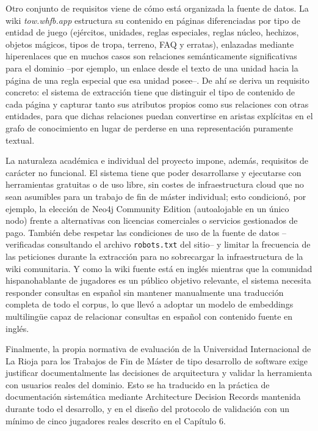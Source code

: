 \documentclass[11pt,a4paper,spanish]{book}
\numberwithin{equation}{chapter}
\numberwithin{figure}{chapter}
\numberwithin{table}{chapter}
\begin{document}
Otro conjunto de requisitos viene de cómo está organizada la fuente de datos. La wiki \emph{tow.whfb.app} estructura su contenido en páginas diferenciadas por tipo de entidad de juego (ejércitos, unidades, reglas especiales, reglas núcleo, hechizos, objetos mágicos, tipos de tropa, terreno, FAQ y erratas), enlazadas mediante hiperenlaces que en muchos casos son relaciones semánticamente significativas para el dominio --por ejemplo, un enlace desde el texto de una unidad hacia la página de una regla especial que esa unidad posee--. De ahí se deriva un requisito concreto: el sistema de extracción tiene que distinguir el tipo de contenido de cada página y capturar tanto sus atributos propios como sus relaciones con otras entidades, para que dichas relaciones puedan convertirse en aristas explícitas en el grafo de conocimiento en lugar de perderse en una representación puramente textual.

La naturaleza académica e individual del proyecto impone, además, requisitos de carácter no funcional. El sistema tiene que poder desarrollarse y ejecutarse con herramientas gratuitas o de uso libre, sin costes de infraestructura cloud que no sean asumibles para un trabajo de fin de máster individual; esto condicionó, por ejemplo, la elección de Neo4j Community Edition (autoalojable en un único nodo) frente a alternativas con licencias comerciales o servicios gestionados de pago. También debe respetar las condiciones de uso de la fuente de datos --verificadas consultando el archivo \texttt{robots.txt} del sitio-- y limitar la frecuencia de las peticiones durante la extracción para no sobrecargar la infraestructura de la wiki comunitaria. Y como la wiki fuente está en inglés mientras que la comunidad hispanohablante de jugadores es un público objetivo relevante, el sistema necesita responder consultas en español sin mantener manualmente una traducción completa de todo el corpus, lo que llevó a adoptar un modelo de embeddings multilingüe capaz de relacionar consultas en español con contenido fuente en inglés.

Finalmente, la propia normativa de evaluación de la Universidad Internacional de La Rioja para los Trabajos de Fin de Máster de tipo desarrollo de software exige justificar documentalmente las decisiones de arquitectura y validar la herramienta con usuarios reales del dominio. Esto se ha traducido en la práctica de documentación sistemática mediante Architecture Decision Records mantenida durante todo el desarrollo, y en el diseño del protocolo de validación con un mínimo de cinco jugadores reales descrito en el Capítulo 6.
\end{document}
